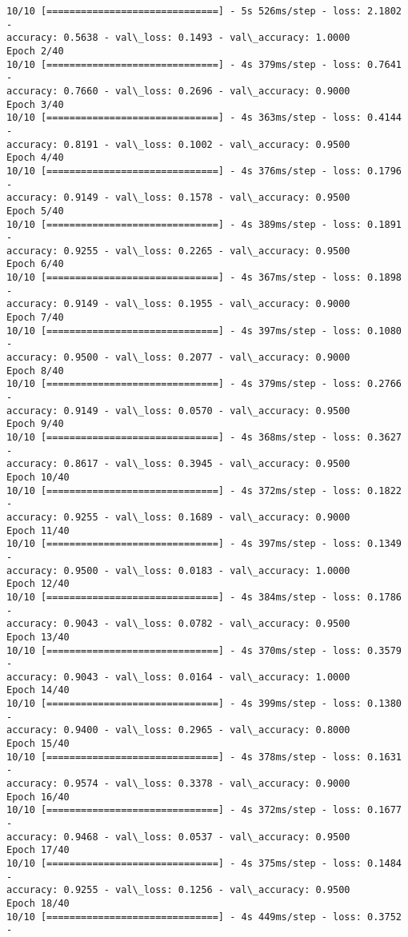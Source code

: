 \documentclass[11pt]{article}
\begin{document}
    \begin{Verbatim}[commandchars=\\\{\}]
10/10 [==============================] - 5s 526ms/step - loss: 2.1802 -
accuracy: 0.5638 - val\_loss: 0.1493 - val\_accuracy: 1.0000
Epoch 2/40
10/10 [==============================] - 4s 379ms/step - loss: 0.7641 -
accuracy: 0.7660 - val\_loss: 0.2696 - val\_accuracy: 0.9000
Epoch 3/40
10/10 [==============================] - 4s 363ms/step - loss: 0.4144 -
accuracy: 0.8191 - val\_loss: 0.1002 - val\_accuracy: 0.9500
Epoch 4/40
10/10 [==============================] - 4s 376ms/step - loss: 0.1796 -
accuracy: 0.9149 - val\_loss: 0.1578 - val\_accuracy: 0.9500
Epoch 5/40
10/10 [==============================] - 4s 389ms/step - loss: 0.1891 -
accuracy: 0.9255 - val\_loss: 0.2265 - val\_accuracy: 0.9500
Epoch 6/40
10/10 [==============================] - 4s 367ms/step - loss: 0.1898 -
accuracy: 0.9149 - val\_loss: 0.1955 - val\_accuracy: 0.9000
Epoch 7/40
10/10 [==============================] - 4s 397ms/step - loss: 0.1080 -
accuracy: 0.9500 - val\_loss: 0.2077 - val\_accuracy: 0.9000
Epoch 8/40
10/10 [==============================] - 4s 379ms/step - loss: 0.2766 -
accuracy: 0.9149 - val\_loss: 0.0570 - val\_accuracy: 0.9500
Epoch 9/40
10/10 [==============================] - 4s 368ms/step - loss: 0.3627 -
accuracy: 0.8617 - val\_loss: 0.3945 - val\_accuracy: 0.9500
Epoch 10/40
10/10 [==============================] - 4s 372ms/step - loss: 0.1822 -
accuracy: 0.9255 - val\_loss: 0.1689 - val\_accuracy: 0.9000
Epoch 11/40
10/10 [==============================] - 4s 397ms/step - loss: 0.1349 -
accuracy: 0.9500 - val\_loss: 0.0183 - val\_accuracy: 1.0000
Epoch 12/40
10/10 [==============================] - 4s 384ms/step - loss: 0.1786 -
accuracy: 0.9043 - val\_loss: 0.0782 - val\_accuracy: 0.9500
Epoch 13/40
10/10 [==============================] - 4s 370ms/step - loss: 0.3579 -
accuracy: 0.9043 - val\_loss: 0.0164 - val\_accuracy: 1.0000
Epoch 14/40
10/10 [==============================] - 4s 399ms/step - loss: 0.1380 -
accuracy: 0.9400 - val\_loss: 0.2965 - val\_accuracy: 0.8000
Epoch 15/40
10/10 [==============================] - 4s 378ms/step - loss: 0.1631 -
accuracy: 0.9574 - val\_loss: 0.3378 - val\_accuracy: 0.9000
Epoch 16/40
10/10 [==============================] - 4s 372ms/step - loss: 0.1677 -
accuracy: 0.9468 - val\_loss: 0.0537 - val\_accuracy: 0.9500
Epoch 17/40
10/10 [==============================] - 4s 375ms/step - loss: 0.1484 -
accuracy: 0.9255 - val\_loss: 0.1256 - val\_accuracy: 0.9500
Epoch 18/40
10/10 [==============================] - 4s 449ms/step - loss: 0.3752 -

\end{Verbatim}
\end{document}
